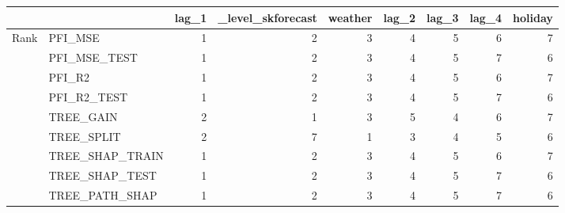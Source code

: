 \begin{tabular}{llrrrrrrr}
\toprule
 &  & lag_1 & _level_skforecast & weather & lag_2 & lag_3 & lag_4 & holiday \\
\midrule
\multirow[t]{9}{*}{Rank} & PFI_MSE & 1 & 2 & 3 & 4 & 5 & 6 & 7 \\
 & PFI_MSE_TEST & 1 & 2 & 3 & 4 & 5 & 7 & 6 \\
 & PFI_R2 & 1 & 2 & 3 & 4 & 5 & 6 & 7 \\
 & PFI_R2_TEST & 1 & 2 & 3 & 4 & 5 & 7 & 6 \\
 & TREE_GAIN & 2 & 1 & 3 & 5 & 4 & 6 & 7 \\
 & TREE_SPLIT & 2 & 7 & 1 & 3 & 4 & 5 & 6 \\
 & TREE_SHAP_TRAIN & 1 & 2 & 3 & 4 & 5 & 6 & 7 \\
 & TREE_SHAP_TEST & 1 & 2 & 3 & 4 & 5 & 7 & 6 \\
 & TREE_PATH_SHAP & 1 & 2 & 3 & 4 & 5 & 7 & 6 \\
\cline{1-9}
\bottomrule
\end{tabular}
